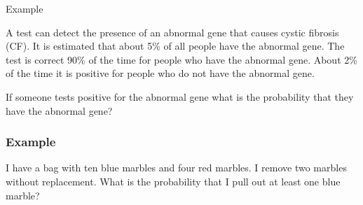 \begin{frame}{Example}

  \vfill

  A test can detect the presence of an abnormal gene that causes cystic
  fibrosis (CF). It is estimated that about 5\% of all people have the
  abnormal gene. The test is correct 90\% of the time for people who
  have the abnormal gene. About 2\% of the time it is positive for
  people who do not have the abnormal gene.

  \vfill

  If someone tests positive for the abnormal gene what is the
  probability that they have the abnormal gene?

  \vfill
  
\end{frame}

\begin{frame}
  \frametitle{Example}

  I have a bag with ten blue marbles and four red marbles. I remove
  two marbles without replacement. What is the probability that I pull
  out at least one blue marble?


  \vfill

\end{frame}



